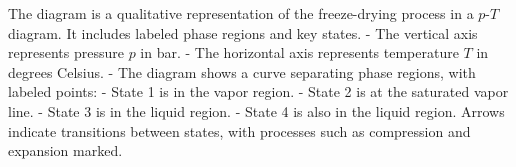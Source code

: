 The diagram is a qualitative representation of the freeze-drying process in a \( p \)-\( T \) diagram. It includes labeled phase regions and key states.  
- The vertical axis represents pressure \( p \) in bar.  
- The horizontal axis represents temperature \( T \) in degrees Celsius.  
- The diagram shows a curve separating phase regions, with labeled points:  
  - State 1 is in the vapor region.  
  - State 2 is at the saturated vapor line.  
  - State 3 is in the liquid region.  
  - State 4 is also in the liquid region.  
Arrows indicate transitions between states, with processes such as compression and expansion marked.